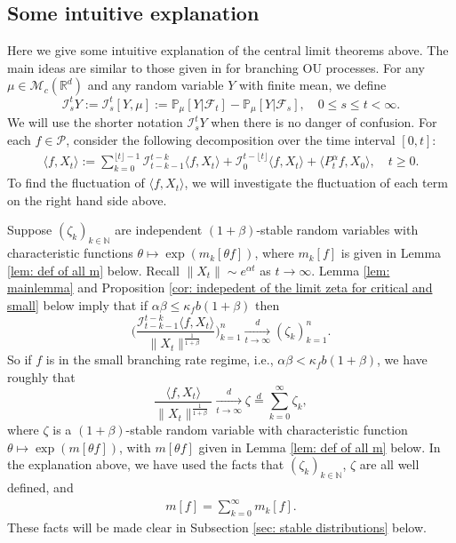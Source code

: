 \documentclass[12pt,a4paper]{amsart}
\theoremstyle{plain}
\theoremstyle{definition}
\numberwithin{equation}{section}
\begin{document}
\subsection{Some intuitive explanation}
Here we give some intuitive explanation of the central limit theorems above.
The main ideas are similar to those given in \cite{MarksMilos2018CLT} for branching OU processes.
For any $\mu\in \mathcal M_c(\mathbb R^d)$ and any random variable $Y$ with finite mean, we define
\begin{equation}
  \label{Ist}
  \mathcal I_s^t Y
  := \mathcal I_s^t [Y, \mu]
  := \mathbb P_\mu[Y|\mathscr F_t] - \mathbb P_\mu[Y|\mathscr F_s],
  \quad 0 \leq s \leq t <\infty.
\end{equation}
We will use the shorter notation $\mathcal I_s^t Y$ when there is no danger of confusion.
For each $f\in \mathcal{P}$, consider the following decomposition over the time interval $[0,t]$:
\begin{align}
  \langle f,X_t\rangle
  := \sum_{k=0}^{\lfloor t \rfloor-1} \mathcal I_{t-k-1}^{t-k}\langle f ,X_t\rangle+\mathcal I_0^{t-\lfloor t \rfloor}\langle f ,X_t\rangle + \langle P^\alpha_tf,X_0\rangle,
  \quad t\geq 0.
\end{align}
To find the fluctuation of $\langle f,X_t\rangle$, we will investigate the fluctuation of each term on the right hand side above.

Suppose $(\zeta_k)_{k \in \mathbb N}$ are independent $(1+\beta)$-stable random variables with characteristic functions
$\theta\mapsto \exp( m_k[\theta f])$, where $m_k[f]$ is given in Lemma \ref{lem: def of all m} below.
Recall $\|X_t\|\sim e^{\alpha t}$ as $t\to\infty$.
Lemma \ref{lem: mainlemma} and Proposition \ref{cor: indepedent of the limit zeta for critical and small} below imply that if $\alpha\beta \leq \kappa_f b(1+\beta) $ then
\[
  \bigg(\frac{\mathcal I^{t-k}_{t-k-1} \langle f,X_t\rangle}{\|X_t\|^{\frac{1}{1+\beta}}} \bigg)_{k=1}^n
  \xrightarrow [t\to \infty]{d} (\zeta_k)_{k=1}^n.
\]
So if $f$ is in the small branching rate regime, i.e., $\alpha \beta < \kappa_f b(1+\beta)$, we have roughly that
\[
  \frac{\langle f,X_t\rangle}{\|X_t\|^{\frac{1}{1+\beta}}} 
  \xrightarrow[t\to \infty]{d} \zeta\overset{d}{=}\sum_{k=0}^\infty \zeta_k,
\]
where $\zeta$ is a $(1+\beta)$-stable random variable with characteristic function
$\theta\mapsto \exp(m[\theta f])$,
with $m[\theta f]$ given in Lemma \ref{lem: def of all m} below.
In the explanation above, we have used the facts that $(\zeta_k)_{k\in \mathbb N}$, $\zeta$ are all well defined, and
\begin{align}
  \label{eq: equatlity for mf for small rate}
  m[f] 
  = \sum_{k=0}^\infty m_k[ f].
\end{align}
These facts will be made clear in Subsection \ref{sec: stable distributions} below.
\end{document}
